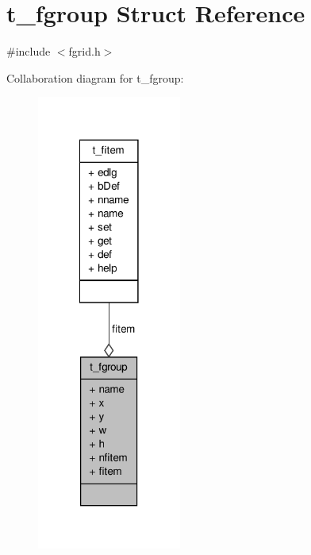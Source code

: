 \hypertarget{structt__fgroup}{\section{t\-\_\-fgroup \-Struct \-Reference}
\label{structt__fgroup}
}


{\ttfamily \#include $<$fgrid.\-h$>$}



\-Collaboration diagram for t\-\_\-fgroup\-:
\nopagebreak
\begin{figure}[H]
\begin{center}
\leavevmode
\includegraphics[width=134pt]{structt__fgroup__coll__graph}
\end{center}
\end{figure}
